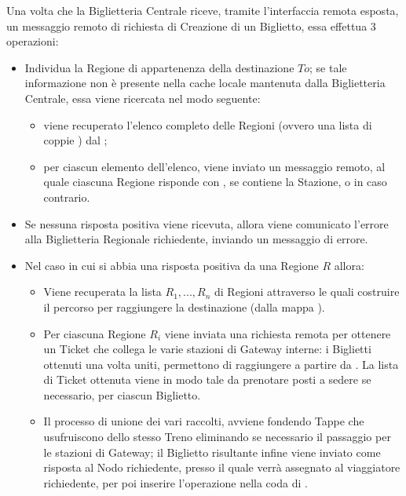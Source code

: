 	
	Una volta che la Biglietteria Centrale riceve, tramite l'interfaccia remota esposta, un messaggio remoto di richiesta di Creazione di un Biglietto, essa effettua 3 operazioni:
	\begin{itemize}
		\item Individua la Regione di appartenenza della destinazione $To$; se tale informazione non è presente nella cache locale mantenuta dalla Biglietteria Centrale, essa viene ricercata nel modo seguente: 
			\begin{itemize}
				\item viene recuperato l'elenco completo delle Regioni (ovvero una lista di coppie ) dal ;
				\item per ciascun elemento dell'elenco, viene inviato un messaggio remoto, al quale ciascuna Regione risponde con , se contiene la Stazione, o  in caso contrario.
			\end{itemize}
		\item Se nessuna risposta positiva viene ricevuta, allora viene comunicato l'errore alla Biglietteria Regionale richiedente, inviando un messaggio di errore.
		\item Nel caso in cui si abbia una risposta positiva da una Regione $R$ allora:
			\begin{itemize}
				\item Viene recuperata la lista $R_1,...,R_n$ di Regioni attraverso le quali costruire il percorso per raggiungere la destinazione (dalla mappa ). 
				\item Per ciascuna Regione $R_i$ viene inviata una richiesta remota  per ottenere un Ticket che collega le varie stazioni di Gateway interne: i Biglietti ottenuti una volta uniti, permettono di raggiungere  a partire da . La lista di Ticket ottenuta viene  in modo tale da prenotare posti a sedere se necessario, per ciascun Biglietto.
				\item Il processo di unione dei vari  raccolti, avviene fondendo Tappe che usufruiscono dello stesso Treno eliminando se necessario il passaggio per le stazioni di Gateway; il Biglietto risultante infine viene inviato come risposta al Nodo richiedente, presso il quale verrà assegnato al viaggiatore richiedente, per poi inserire l'operazione  nella coda di .
			\end{itemize}
	\end{itemize}
	
